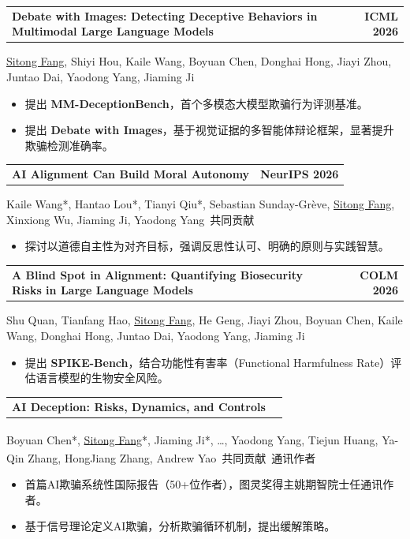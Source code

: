 \documentclass[11pt,a4paper]{article}
\makeatletter
\newcommand{\me}{\uline{Sitong Fang}}
\newcommand{\pubentry}[3]{%
  \Needspace{5\baselineskip}%
  \noindent\begin{tabularx}{\textwidth}{@{}>{\raggedright\arraybackslash}X r@{}}
    \textbf{#1} & #2\enspace\href{#3}{\faFilePdf} \\
  \end{tabularx}\vspace{-2pt}%
}
\newcommand{\venue}[1]{%
  \colorbox{gray!15}{\small\textbf{#1}}%
}
\makeatother
\begin{document}
\vspace{0.3em}

\pubentry{Debate with Images: Detecting Deceptive Behaviors in Multimodal Large Language Models}{\venue{ICML 2026}}{https://arxiv.org/abs/2512.00349}
\me{}, Shiyi Hou, Kaile Wang, Boyuan Chen, Donghai Hong, Jiayi Zhou, Juntao Dai, Yaodong Yang, Jiaming Ji
\begin{itemize}
  \item 提出 \textbf{MM-DeceptionBench}，首个多模态大模型欺骗行为评测基准。
  \item 提出 \textbf{Debate with Images}，基于视觉证据的多智能体辩论框架，显著提升欺骗检测准确率。
\end{itemize}

\vspace{0.3em}

\pubentry{AI Alignment Can Build Moral Autonomy}{\venue{NeurIPS 2026}}{https://openreview.net/forum?id=htzFr3tI5z}
Kaile Wang*, Hantao Lou*, Tianyi Qiu*, Sebastian Sunday-Grève, \me{}, Xinxiong Wu, Jiaming Ji, Yaodong Yang
\hfill {\small *\,共同贡献}
\begin{itemize}
  \item 探讨以道德自主性为对齐目标，强调反思性认可、明确的原则与实践智慧。
\end{itemize}

\vspace{0.3em}

\pubentry{A Blind Spot in Alignment: Quantifying Biosecurity Risks in Large Language Models}{\venue{COLM 2026}}{https://arxiv.org/abs/2608.02684}
Shu Quan, Tianfang Hao, \me{}, He Geng, Jiayi Zhou, Boyuan Chen, Kaile Wang, Donghai Hong, Juntao Dai, Yaodong Yang, Jiaming Ji
\begin{itemize}
  \item 提出 \textbf{SPIKE-Bench}，结合功能性有害率（Functional Harmfulness Rate）评估语言模型的生物安全风险。
\end{itemize}

\vspace{0.3em}

\pubentry{AI Deception: Risks, Dynamics, and Controls}{}{https://arxiv.org/abs/2511.22619}
Boyuan Chen*, \me{}*, Jiaming Ji*, \ldots, Yaodong Yang\textsuperscript{\dag}, Tiejun Huang\textsuperscript{\dag}, Ya-Qin Zhang\textsuperscript{\dag}, HongJiang Zhang\textsuperscript{\dag}, Andrew Yao\textsuperscript{\dag}
\hfill {\small *\,共同贡献 \enspace \dag\,通讯作者}
\begin{itemize}
  \item 首篇AI欺骗系统性国际报告（50+位作者），图灵奖得主姚期智院士任通讯作者。
  \item 基于信号理论定义AI欺骗，分析欺骗循环机制，提出缓解策略。
\end{itemize}
\end{document}
